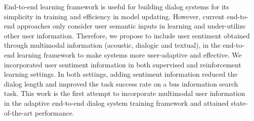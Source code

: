 End-to-end learning framework is useful for building dialog systems for its simplicity in training and efficiency in model updating. However, current end-to-end approaches only consider user semantic inputs in learning and under-utilize other user information. Therefore, we propose to include user sentiment obtained through multimodal information (acoustic, dialogic and textual), in the end-to-end learning framework to make systems more user-adaptive and effective. We incorporated user sentiment information in both supervised and reinforcement learning settings. In both settings, adding sentiment information reduced the dialog length and improved the task success rate on a bus information search task. This work is the first attempt to incorporate multimodal user information in the adaptive end-to-end dialog system training framework and attained state-of-the-art performance.
